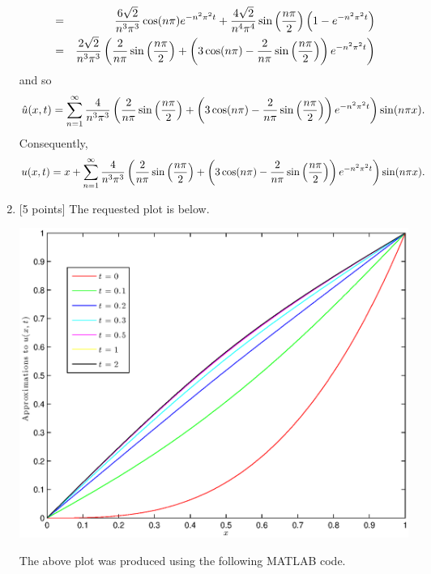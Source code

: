 \begin{solution}
\begin{enumerate}
\begin{eqnarray*}
\\
&=&{6\sqrt{2} \over n^3\pi^3}\cos(n\pi)e^{-n^2\pi^2t}+\frac{4\sqrt{2}}{n^4\pi^4}\sin\left(\frac{n\pi}{2}\right)\left(1-e^{-n^2\pi^2t}\right)
\\
&=&{2\sqrt{2} \over n^3\pi^3}\left(\frac{2}{n\pi}\sin\left(\frac{n\pi}{2}\right)+\left(3\cos(n\pi)-\frac{2}{n\pi}\sin\left(\frac{n\pi}{2}\right)\right)e^{-n^2\pi^2t}\right)
\end{eqnarray*}
and so
\[
\hat{u}(x,t)=\sum_{n=1}^\infty {4 \over n^3\pi^3}\left(\frac{2}{n\pi}\sin\left(\frac{n\pi}{2}\right)+\left(3\cos(n\pi)-\frac{2}{n\pi}\sin\left(\frac{n\pi}{2}\right)\right)e^{-n^2\pi^2t}\right)\sin(n\pi x).
\]
Consequently,
\[
u(x,t)=x+\sum_{n=1}^\infty {4 \over n^3\pi^3}\left(\frac{2}{n\pi}\sin\left(\frac{n\pi}{2}\right)+\left(3\cos(n\pi)-\frac{2}{n\pi}\sin\left(\frac{n\pi}{2}\right)\right)e^{-n^2\pi^2t}\right)\sin(n\pi x).
\]

\item {[5 points]} The requested plot is below.

\begin{center}\includegraphics[scale=0.7]{hw38d.eps}\end{center}

The above plot was produced using the following MATLAB code.



\end{enumerate}

\end{solution}